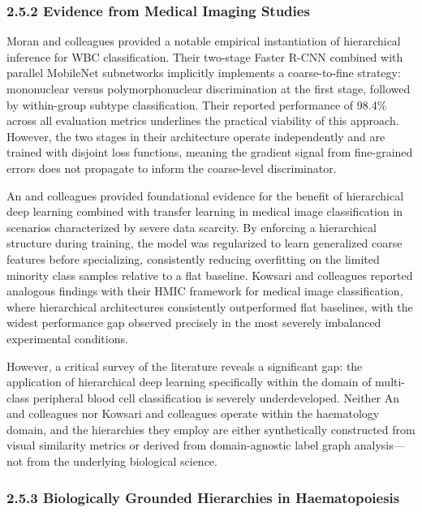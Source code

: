 \documentclass[11pt]{article}
\begin{document}
\subsubsection*{2.5.2 Evidence from Medical Imaging Studies}

Moran and colleagues \cite{moran2022} provided a notable empirical instantiation of hierarchical inference for WBC classification. Their two-stage Faster R-CNN combined with parallel MobileNet subnetworks implicitly implements a coarse-to-fine strategy: mononuclear versus polymorphonuclear discrimination at the first stage, followed by within-group subtype classification. Their reported performance of 98.4\% across all evaluation metrics underlines the practical viability of this approach. However, the two stages in their architecture operate independently and are trained with disjoint loss functions, meaning the gradient signal from fine-grained errors does not propagate to inform the coarse-level discriminator.

An and colleagues \cite{an2021} provided foundational evidence for the benefit of hierarchical deep learning combined with transfer learning in medical image classification in scenarios characterized by severe data scarcity. By enforcing a hierarchical structure during training, the model was regularized to learn generalized coarse features before specializing, consistently reducing overfitting on the limited minority class samples relative to a flat baseline. Kowsari and colleagues \cite{kowsari2020} reported analogous findings with their HMIC framework for medical image classification, where hierarchical architectures consistently outperformed flat baselines, with the widest performance gap observed precisely in the most severely imbalanced experimental conditions.

However, a critical survey of the literature reveals a significant gap: the application of hierarchical deep learning specifically within the domain of multi-class peripheral blood cell classification is severely underdeveloped. Neither An and colleagues \cite{an2021} nor Kowsari and colleagues \cite{kowsari2020} operate within the haematology domain, and the hierarchies they employ are either synthetically constructed from visual similarity metrics or derived from domain-agnostic label graph analysis—not from the underlying biological science.

\subsubsection*{2.5.3 Biologically Grounded Hierarchies in Haematopoiesis}
\end{document}
